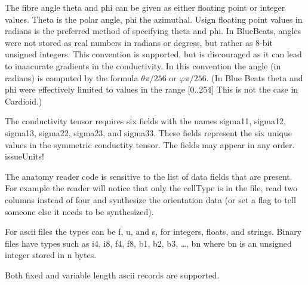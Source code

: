 \documentclass{article}
\begin{document}
The fibre angle theta and phi can be given as either floating point or
integer values.  Theta is the polar angle, phi the azimuthal.  Usign
floating point values in radians is the preferred method of specifying
theta and phi.  In BlueBeats, angles were not stored as real numbers in
radians or degress, but rather as 8-bit unsigned integers.  This
convention is supported, but is discouraged as it can lead to inaacurate
gradients in the conductivity.  In this convention the angle (in
radians) is computed by the formula $\theta\pi/256$ or $\varphi\pi/256$.
(In Blue Beats theta and phi were effectively limited to values in the
range [0..254] This is not the case in Cardioid.)


The conductivity tensor requires six
fields with the names sigma11, sigma12, sigma13, sigma22, sigma23, and
sigma33.  These fields represent the six unique values in the symmetric
conductity tensor.  The fields may appear in any order. issue{Units!}


The anatomy reader code is sensitive to the list of data fields
that are present.  For example the reader will notice that only the
cellType is in the file, read two columns instead of four and synthesize
the orientation data (or set a flag to tell someone else it needs to be
synthesized).

For ascii files the types can be f, u, and s, for integers, floats, and
strings.  Binary files have types such as i4, i8, f4, f8, b1, b2, b3, \ldots,
bn where bn is an unsigned integer stored in n bytes.


Both fixed and variable length ascii records are supported.
\end{document}
